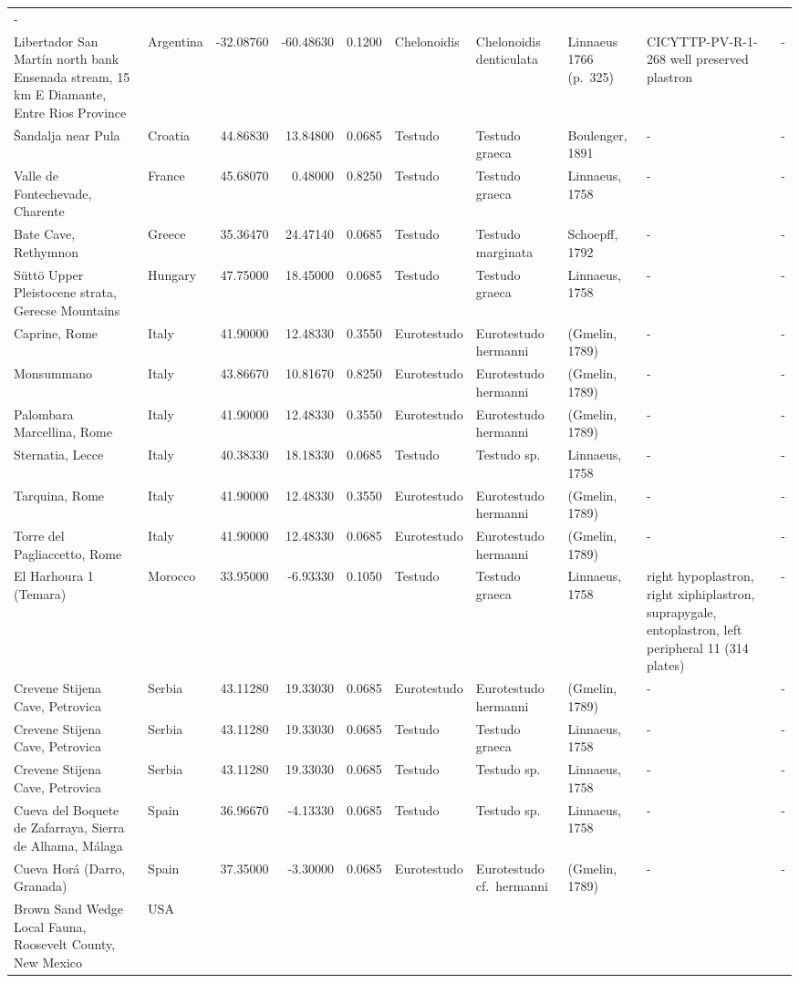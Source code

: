 \documentclass[]{article}
\begin{document}
\begin{longtable}[]{@{}llrrrlllll@{}}
-\tabularnewline
Libertador San Martín north bank Ensenada stream, 15 km E Diamante,
Entre Rios Province & Argentina & -32.08760 & -60.48630 & 0.1200 &
Chelonoidis & Chelonoidis denticulata & Linnaeus 1766 (p.~325) &
CICYTTP-PV-R-1-268 well preserved plastron & -\tabularnewline
Šandalja near Pula & Croatia & 44.86830 & 13.84800 & 0.0685 & Testudo &
Testudo graeca & Boulenger, 1891 & - & -\tabularnewline
Valle de Fontechevade, Charente & France & 45.68070 & 0.48000 & 0.8250 &
Testudo & Testudo graeca & Linnaeus, 1758 & - & -\tabularnewline
Bate Cave, Rethymnon & Greece & 35.36470 & 24.47140 & 0.0685 & Testudo &
Testudo marginata & Schoepff, 1792 & - & -\tabularnewline
Süttö Upper Pleistocene strata, Gerecse Mountains & Hungary & 47.75000 &
18.45000 & 0.0685 & Testudo & Testudo graeca & Linnaeus, 1758 & - &
-\tabularnewline
Caprine, Rome & Italy & 41.90000 & 12.48330 & 0.3550 & Eurotestudo &
Eurotestudo hermanni & (Gmelin, 1789) & - & -\tabularnewline
Monsummano & Italy & 43.86670 & 10.81670 & 0.8250 & Eurotestudo &
Eurotestudo hermanni & (Gmelin, 1789) & - & -\tabularnewline
Palombara Marcellina, Rome & Italy & 41.90000 & 12.48330 & 0.3550 &
Eurotestudo & Eurotestudo hermanni & (Gmelin, 1789) & - &
-\tabularnewline
Sternatia, Lecce & Italy & 40.38330 & 18.18330 & 0.0685 & Testudo &
Testudo sp. & Linnaeus, 1758 & - & -\tabularnewline
Tarquina, Rome & Italy & 41.90000 & 12.48330 & 0.3550 & Eurotestudo &
Eurotestudo hermanni & (Gmelin, 1789) & - & -\tabularnewline
Torre del Pagliaccetto, Rome & Italy & 41.90000 & 12.48330 & 0.0685 &
Eurotestudo & Eurotestudo hermanni & (Gmelin, 1789) & - &
-\tabularnewline
El Harhoura 1 (Temara) & Morocco & 33.95000 & -6.93330 & 0.1050 &
Testudo & Testudo graeca & Linnaeus, 1758 & right hypoplastron, right
xiphiplastron, suprapygale, entoplastron, left peripheral 11 (314
plates) & -\tabularnewline
Crevene Stijena Cave, Petrovica & Serbia & 43.11280 & 19.33030 & 0.0685
& Eurotestudo & Eurotestudo hermanni & (Gmelin, 1789) & - &
-\tabularnewline
Crevene Stijena Cave, Petrovica & Serbia & 43.11280 & 19.33030 & 0.0685
& Testudo & Testudo graeca & Linnaeus, 1758 & - & -\tabularnewline
Crevene Stijena Cave, Petrovica & Serbia & 43.11280 & 19.33030 & 0.0685
& Testudo & Testudo sp. & Linnaeus, 1758 & - & -\tabularnewline
Cueva del Boquete de Zafarraya, Sierra de Alhama, Málaga & Spain &
36.96670 & -4.13330 & 0.0685 & Testudo & Testudo sp. & Linnaeus, 1758 &
- & -\tabularnewline
Cueva Horá (Darro, Granada) & Spain & 37.35000 & -3.30000 & 0.0685 &
Eurotestudo & Eurotestudo cf.~hermanni & (Gmelin, 1789) & - &
-\tabularnewline
Brown Sand Wedge Local Fauna, Roosevelt County, New Mexico & USA &

\end{longtable}
\end{document}

